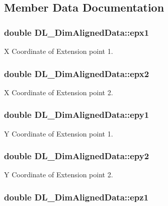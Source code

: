 \subsection{Member Data Documentation}
\hypertarget{structDL__DimAlignedData_a2dea72d8fbed1d708fb5e2e66c71146e}{
\subsubsection[{epx1}]{\setlength{\rightskip}{0pt plus 5cm}double D\-L\-\_\-\-Dim\-Aligned\-Data\-::epx1}}\label{structDL__DimAlignedData_a2dea72d8fbed1d708fb5e2e66c71146e}
X Coordinate of Extension point 1. \hypertarget{structDL__DimAlignedData_a3fe88cc0c10a0b74d4c05d686ea0b40f}{
\subsubsection[{epx2}]{\setlength{\rightskip}{0pt plus 5cm}double D\-L\-\_\-\-Dim\-Aligned\-Data\-::epx2}}\label{structDL__DimAlignedData_a3fe88cc0c10a0b74d4c05d686ea0b40f}
X Coordinate of Extension point 2. \hypertarget{structDL__DimAlignedData_abe35b1951b67d9092ce237aa53cfc1cb}{
\subsubsection[{epy1}]{\setlength{\rightskip}{0pt plus 5cm}double D\-L\-\_\-\-Dim\-Aligned\-Data\-::epy1}}\label{structDL__DimAlignedData_abe35b1951b67d9092ce237aa53cfc1cb}
Y Coordinate of Extension point 1. \hypertarget{structDL__DimAlignedData_a61d3ab3a20ed5df8d21c471ba5aab180}{
\subsubsection[{epy2}]{\setlength{\rightskip}{0pt plus 5cm}double D\-L\-\_\-\-Dim\-Aligned\-Data\-::epy2}}\label{structDL__DimAlignedData_a61d3ab3a20ed5df8d21c471ba5aab180}
Y Coordinate of Extension point 2. \hypertarget{structDL__DimAlignedData_a37f500423bccdcecb6fff65fba9e7795}{
\subsubsection[{epz1}]{\setlength{\rightskip}{0pt plus 5cm}double D\-L\-\_\-\-Dim\-Aligned\-Data\-::epz1}}\label{structDL__DimAlignedData_a37f500423bccdcecb6fff65fba9e7795}
